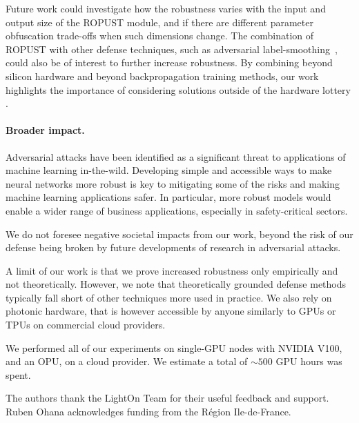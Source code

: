 \documentclass{article}
\begin{document}
Future work could investigate how the robustness varies with the input and output size of the ROPUST module, and if there are different parameter obfuscation trade-offs when such dimensions change. The combination of ROPUST with other defense techniques, such as adversarial label-smoothing~\cite{Goibert2019AdversarialRV}, could also be of interest to further increase robustness. By combining beyond silicon hardware and beyond backpropagation training methods, our work highlights the importance of considering solutions outside of the hardware lottery \cite{Hooker2020TheHL}. 

\paragraph{Broader impact.} Adversarial attacks have been identified as a significant threat to applications of machine learning in-the-wild. Developing simple and accessible ways to make neural networks more robust is key to mitigating some of the risks and making machine learning applications safer. In particular, more robust models would enable a wider range of business applications, especially in safety-critical sectors. 

We do not foresee negative societal impacts from our work, beyond the risk of our defense being broken by future developments of research in adversarial attacks.

A limit of our work is that we prove increased robustness only empirically and not theoretically. However, we note that theoretically grounded defense methods typically fall short of other techniques more used in practice. We also rely on photonic hardware, that is however accessible by anyone similarly to GPUs or TPUs on commercial cloud providers.

We performed all of our experiments on single-GPU nodes with NVIDIA V100, and an OPU, on a cloud provider. We estimate a total of $\sim 500$ GPU hours was spent.

\begin{ack}
The authors thank the LightOn Team for their useful feedback and support. Ruben Ohana acknowledges funding from the R\'egion Ile-de-France.
\end{ack}



\end{document}
